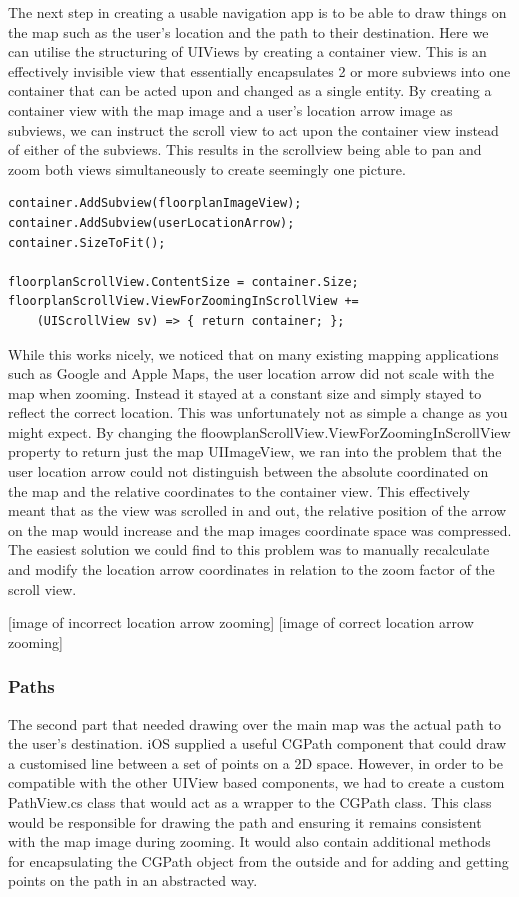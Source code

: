 \documentclass[12pt,a4paper]{report}
\begin{document}
The next step in creating a usable navigation app is to be able to draw things on the map such as the user's location and the path to their destination. Here we can utilise the structuring of UIViews by creating a container view. This is an effectively invisible view that essentially encapsulates 2 or more subviews into one container that can be acted upon and changed as a single entity. By creating a container view with the map image and a user's location arrow image as subviews, we can instruct the scroll view to act upon the container view instead of either of the subviews. This results in the scrollview being able to pan and zoom both views simultaneously to create seemingly one picture. 

\begin{lstlisting}
container.AddSubview(floorplanImageView);
container.AddSubview(userLocationArrow);
container.SizeToFit();

floorplanScrollView.ContentSize = container.Size;
floorplanScrollView.ViewForZoomingInScrollView += 
	(UIScrollView sv) => { return container; };
\end{lstlisting}
While this works nicely, we noticed that on many existing mapping applications such as Google and Apple Maps, the user location arrow did not scale with the map when zooming. Instead it stayed at a constant size and simply stayed to reflect the correct location. This was unfortunately not as simple a change as you might expect. By changing the floowplanScrollView.ViewForZoomingInScrollView property to return just the map UIImageView, we ran into the problem that the user location arrow could not distinguish between the absolute coordinated on the map and the relative coordinates to the container view. This effectively meant that as the view was scrolled in and out, the relative position of the arrow on the map would increase and the map images coordinate space was compressed. The easiest solution we could find to this problem was to manually recalculate and modify the location arrow coordinates in relation to the zoom factor of the scroll view.


[image of incorrect location arrow zooming]
[image of correct location arrow zooming]

\subsubsection{Paths}

The second part that needed drawing over the main map was the actual path to the user's destination. iOS supplied a useful CGPath component that could draw a customised line between a set of points on a 2D space. However, in order to be compatible with the other UIView based components, we had to create a custom PathView.cs class that would act as a wrapper to the CGPath class. This class would be responsible for drawing the path and ensuring it remains consistent with the map image during zooming. It would also contain additional methods for encapsulating the CGPath object from the outside and for adding and getting points on the path in an abstracted way. 
\end{document}
